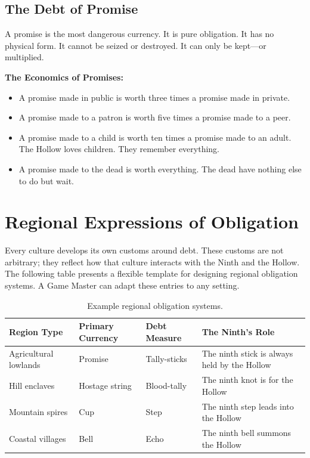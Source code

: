 \documentclass[11pt,letterpaper,twoside]{book}
\begin{document}
\subsection{The Debt of Promise}

A promise is the most dangerous currency. It is pure obligation. It has no physical form. It cannot be seized or destroyed. It can only be kept---or multiplied.

\textbf{The Economics of Promises:}
\begin{itemize}
\item A promise made in public is worth three times a promise made in private.
\item A promise made to a patron is worth five times a promise made to a peer.
\item A promise made to a child is worth ten times a promise made to an adult. The Hollow loves children. They remember everything.
\item A promise made to the dead is worth everything. The dead have nothing else to do but wait.
\end{itemize}

\section{Regional Expressions of Obligation}

Every culture develops its own customs around debt. These customs are not arbitrary; they reflect how that culture interacts with the Ninth and the Hollow. The following table presents a flexible template for designing regional obligation systems. A Game Master can adapt these entries to any setting.

\begin{table}[h]
\centering
\begin{tabular}{|p{3cm}|p{3cm}|p{3cm}|p{3cm}|}
\hline
\textbf{Region Type} & \textbf{Primary Currency} & \textbf{Debt Measure} & \textbf{The Ninth's Role} \\
\hline
Agricultural lowlands & Promise & Tally-sticks & The ninth stick is always held by the Hollow \\
Hill enclaves & Hostage string & Blood-tally & The ninth knot is for the Hollow \\
Mountain spires & Cup & Step & The ninth step leads into the Hollow \\
Coastal villages & Bell & Echo & The ninth bell summons the Hollow \\
\hline
\end{tabular}
\caption{Example regional obligation systems.}
\end{table}
\end{document}

